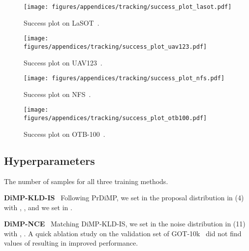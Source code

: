 \documentclass{bmvc2k}
\newcommand{\parsection}[1]{\vspace{2mm}\noindent\textbf{#1}~ }
\begin{document}
\begin{appendices}
\begin{figure}[t]\begin{minipage}{0.475\textwidth}\centering
        \texttt{[image: figures/appendices/tracking/success\_plot\_lasot.pdf]}\vspace{-7.0mm}
        \caption{Success plot on LaSOT~\cite{fan2019lasot}.}\vspace{-3mm}
        \label{fig:tracking_lasot}\end{minipage}
    \quad
    \begin{minipage}{0.475\textwidth}\centering
        \texttt{[image: figures/appendices/tracking/success\_plot\_uav123.pdf]}\vspace{-7.0mm}
        \caption{Success plot on UAV123~\cite{UAV123}.}\vspace{-3mm}
        \label{fig:tracking_uav123}\end{minipage}\end{figure}

\begin{figure}[t]\begin{minipage}{0.475\textwidth}\centering
        \texttt{[image: figures/appendices/tracking/success\_plot\_nfs.pdf]}\vspace{-7.0mm}
        \caption{Success plot on NFS~\cite{NFS}.}\vspace{-3mm}
        \label{fig:tracking_nfs}\end{minipage}
    \quad
    \begin{minipage}{0.475\textwidth}\centering
        \texttt{[image: figures/appendices/tracking/success\_plot\_otb100.pdf]}\vspace{-7.0mm}
        \caption{Success plot on OTB-100~\cite{OTB100}.}\vspace{-3mm}
        \label{fig:tracking_otb100}\end{minipage}\end{figure}

\subsection{Hyperparameters}
The number of samples  for all three training methods.


\parsection{DiMP-KLD-IS}
Following PrDiMP, we set  in the proposal distribution  in (4) with , , and we set  in .


\parsection{DiMP-NCE}
Matching DiMP-KLD-IS, we set  in the noise distribution  in (11) with , . A quick ablation study on the validation set of GOT-10k~\cite{huang2019got} did not find values of  resulting in improved performance.




\end{appendices}
\end{document}
